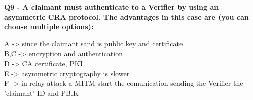 \textbf{Q9 - A claimant must authenticate to a Verifier by using an asymmetric CRA protocol. The advantages in this case are (you can choose multiple options):}
\textcolor{Comment}{
    A -> since the claimant sand is public key and certificate\\
    B,C -> encryption and authentication\\
    D -> CA certificate, PKI\\
    E -> asymmetric cryptography is slower\\
    F -> in relay attack a MITM start the comunication sending the Verifier the 'claimant' ID and PB.K }
